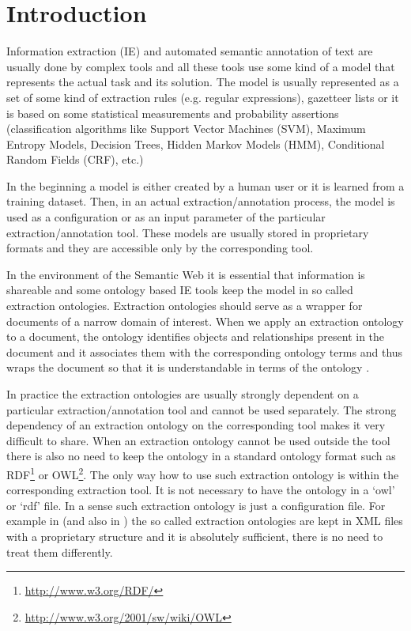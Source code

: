 \documentclass[10pt, conference, compsocconf]{IEEEtran}
\begin{document}
\section{Introduction}


Information extraction (IE) and automated semantic annotation of text are usually done by complex tools and all these tools use some kind of a model that represents the actual task and its solution. The model is usually represented as a set of some kind of extraction rules (e.g. regular expressions), gazetteer lists or it is based on some statistical measurements and probability assertions (classification algorithms like Support Vector Machines (SVM), Maximum Entropy Models, Decision Trees, Hidden Markov Models (HMM), Conditional Random Fields (CRF), etc.)

In the beginning a model is either created by a human user or it is learned from a training dataset. Then, in an actual extraction/annotation process, the model is used as a configuration or as an input parameter of the particular extraction/annotation tool. These models are usually stored in proprietary formats and they are accessible only by the corresponding tool.

In the environment of the Semantic Web it is essential that information is shareable and some ontology based IE tools keep the model in so called extraction ontologies. Extraction ontologies should serve as a wrapper for documents of a narrow domain of interest. When we apply an extraction ontology to a document, the ontology identifies objects and relationships present in the document and it associates them with the corresponding ontology terms and thus wraps the document so that it is understandable in terms of the ontology \cite{DBLP:conf/er/EmbleyTL02}.



In practice the extraction ontologies are usually strongly dependent on a particular extraction/annotation tool and cannot be used separately. The strong dependency of an extraction ontology on the corresponding tool makes it very difficult to share. When an extraction ontology cannot be used outside the tool there is also no need to keep the ontology in a standard ontology format such as RDF\footnote{\url{http://www.w3.org/RDF/}} or OWL\footnote{\url{http://www.w3.org/2001/sw/wiki/OWL}}. The only way how to use such extraction ontology is within the corresponding extraction tool. It is not necessary to have the ontology in a `owl' or `rdf' file. In a sense such extraction ontology is just a configuration file. For example in \cite{springerlink:10.1007/978-3-642-01891-6_5} %
 (and also in \cite{DBLP:conf/er/EmbleyTL02}) the so called extraction ontologies are kept in XML files with a proprietary structure and it is absolutely sufficient, there is no need to treat them differently.
\end{document}
